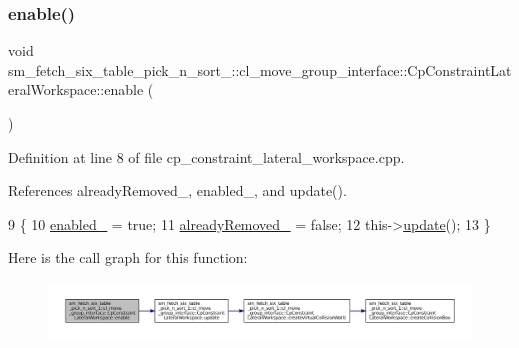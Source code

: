 \subsubsection{\texorpdfstring{enable()}{enable()}}
{\footnotesize\ttfamily void sm\+\_\+fetch\+\_\+six\+\_\+table\+\_\+pick\+\_\+n\+\_\+sort\+\_\+::cl\+\_\+move\+\_\+group\+\_\+interface\+::\+Cp\+Constraint\+Lateral\+Workspace\+::enable (\begin{DoxyParamCaption}{ }\end{DoxyParamCaption})}



Definition at line 8 of file cp\+\_\+constraint\+\_\+lateral\+\_\+workspace.\+cpp.



References already\+Removed\+\_\+, enabled\+\_\+, and update().


\begin{DoxyCode}
9         \{
10             \hyperlink{classsm__fetch__six__table__pick__n__sort__1_1_1cl__move__group__interface_1_1CpConstraintLateralWorkspace_ab8da476ed73090751dc61b38cb9426a3}{enabled\_} = \textcolor{keyword}{true};
11             \hyperlink{classsm__fetch__six__table__pick__n__sort__1_1_1cl__move__group__interface_1_1CpConstraintLateralWorkspace_a303f8baa5e4a7ab06033b1885d604fb4}{alreadyRemoved\_} = \textcolor{keyword}{false};
12             this->\hyperlink{classsm__fetch__six__table__pick__n__sort__1_1_1cl__move__group__interface_1_1CpConstraintLateralWorkspace_ac2b93d99ca5fb46aabfa98040124b272}{update}();
13         \}
\end{DoxyCode}
Here is the call graph for this function\+:
\nopagebreak
\begin{figure}[H]
\begin{center}
\leavevmode
\includegraphics[width=350pt]{classsm__fetch__six__table__pick__n__sort__1_1_1cl__move__group__interface_1_1CpConstraintLateralWorkspace_a91801fc90494a12a4040b56f2f25e047_cgraph}
\end{center}
\end{figure}
\mbox{\label{classsm__fetch__six__table__pick__n__sort__1_1_1cl__move__group__interface_1_1CpConstraintLateralWorkspace_ab6a7532f9f5c0a52eb149177dcadfeb2}} 
